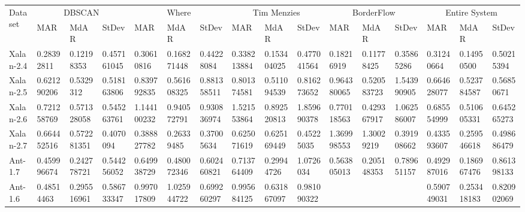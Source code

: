 \documentclass[12pt]{report}
\begin{document}
\begin{landscape}
\begin{table}[h]
\label{dimReducedTable}
 \label{results} 
\begin{tabular}{|l|l|l|l|l|l|l|l|l|l|l|l|l|l|l|l|}
\hline
\multirow{2}{*}{Dataset} & \multicolumn{3}{c|}{DBSCAN}                             & \multicolumn{3}{c|}{Where}                                & \multicolumn{3}{c|}{Tim Menzies}                          & \multicolumn{3}{c|}{BorderFlow}                           & \multicolumn{3}{c|}{Entire System}                       \\ \cline{2-16} 
                         & MAR               & MdAR              & StDev           & MAR               & MdAR              & StDev             & MAR               & MdAR              & StDev             & MAR               & MdAR              & StDev             & MAR               & MdAR             & StDev             \\ \hline
Xalan-2.4 & 0.28392811 & 0.12198353 & 0.457161045 & 0.30610816 & 0.168271448 & 0.44228084 & 0.338213884 & 0.153404025 & 0.477041564 & 0.18216919 & 0.11778425 & 0.35865286 & 0.31240664 & 0.14950500 & 0.50215394 \\ \hline
Xalan-2.5  &  0.621290206 &	0.5329312 &	0.518163806 & 0.839792835 &	0.561608325	& 0.881358511 & 0.801374581 &
	0.511094539	& 0.816273652 & 0.964380065 &	0.520583723	&1.543990905 & 0.664628077 &	0.523784587	&0.56850671   \\ \hline
Xalan-2.6  &   0.721258769	&0.571328058	&0.545263761&
1.144100232	&0.940572791	&0.930836974&
1.521553864	&0.892520813	&1.859690378&
0.770118563	&0.429367917	&1.062586007&
0.685554999	&0.510605331	&0.645265273\\ \hline
Xalan-2.7  & 0.664452516&	0.572281351&	0.4070094&
0.388827782&    0.26339485&	0.37005634&
0.625071619&	0.625169449&	0.45225035&
1.369998553&	1.30029219&     0.391908662&
0.433593607&	0.259546618&	0.498686479 \\ \hline
		Ant-1.7 &0.459996674&	0.242778721&	0.544256052&
0.649938729&	0.480072346&	0.602460821&
0.713764409&	0.29944726&	1.0726034&
0.563805013&	0.205148353&	0.789651157&
0.492987016&	0.186967476&	0.861398133		\\ \hline
Ant-1.6&0.48514463&	0.295516961&	0.586733347&
0.997017809&	1.025944722&	0.699260297&
0.995684125&	0.631867097&	0.981090322&
		&&&
0.590749031	&0.253418183&	0.820902069\\ \hline


\end{tabular}
\end{table}
\end{landscape}
\end{document}
